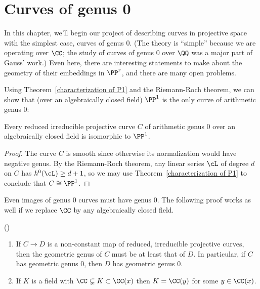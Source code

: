 

\chapter{Curves of genus 0 }\label{genus 0 chapter}\label{3a}\label{genus 0 and 1 chapter}

In this chapter, we'll begin our project of describing curves in projective space with the simplest case, curves of genus 0. (The theory is ``simple'' because we are operating over $\CC$; the study of curves of genus 0 over $\QQ$ was a major part of Gauss' work.) Even here, there are interesting statements to make about the geometry of their embeddings in $\PP^r$, and there are many open problems.
 

Using Theorem~\ref{characterization of P1} and the Riemann-Roch theorem, we can show that (over an algebraically closed field) $\PP^1$
is the only curve of arithmetic genus 0:

\begin{corollary}
 Every reduced irreducible projective curve $C$ of arithmetic genus 0 over an algebraically closed field is isomorphic to $\PP^1$.
 \end{corollary}

\begin{proof}
The curve $C$ is smooth since otherwise its normalization would have negative genus.
By the Riemann-Roch theorem, any linear series $\cL$ of degree $d$ on $C$ has $h^0(\cL) \geq d+1$, so we may use Theorem~\ref{characterization of P1}
to conclude that $C\cong \PP^1$.
\end{proof}

Even images of genus 0 curves must have genus 0. The following proof works as well if we replace $\CC$ by any algebraically
closed field.

\begin{theorem}(\cite{Luroth})\label{Lueroth}
\begin{enumerate}
\item If $C\to D$ is a non-constant map of reduced, irreducible projective curves, then the geometric genus of $C$ must be at least that of $D$.
In particular, if $C$ has geometric genus 0,  
then $D$ has geometric genus 0.
 \item If $K$ is a field with $\CC \subsetneq K \subset \CC(x)$
  then $K = \CC(y)$ for some $y \in \CC(x)$. 
\end{enumerate}
\end{theorem}


